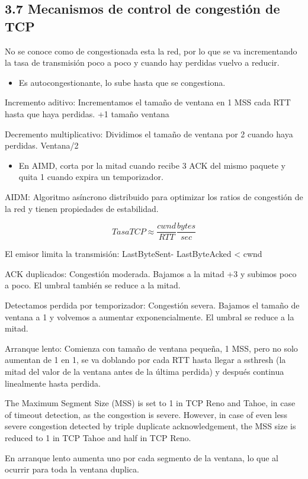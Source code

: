 \documentclass[12pt, twoside, openright]{report} %
\begin{document}
\subsection{3.7 Mecanismos de control de congestión de TCP}


No se conoce como de congestionada esta la red, por lo que se va
incrementando la tasa de transmisión poco a poco y cuando hay
perdidas vuelvo a reducir.

\begin{itemize}
	\item Es autocongestionante, lo sube hasta que se congestiona.
\end{itemize}

Incremento aditivo: Incrementamos el tamaño de ventana en 1 MSS cada
RTT hasta que haya perdidas. +1 tamaño ventana

Decremento multiplicativo: Dividimos el tamaño de ventana por 2
cuando haya perdidas. Ventana/2

\begin{itemize}
	\item En AIMD, corta por la mitad cuando recibe 3 ACK del mismo paquete
	      y quita 1 cuando expira un temporizador.
\end{itemize}

AIDM: Algoritmo asíncrono distribuido para optimizar los ratios de
congestión de la red y tienen propiedades de estabilidad.

$$Tasa TCP \approx \frac {cwnd} {RTT} \frac {bytes}{sec}$$

El emisor limita la transmisión: LastByteSent- LastByteAcked
\textless{} cwnd

ACK duplicados: Congestión moderada. Bajamos a la mitad +3 y
subimos poco a poco. El umbral también se reduce a la mitad.

Detectamos perdida por temporizador: Congestión severa. Bajamos el
tamaño de ventana a 1 y volvemos a aumentar exponencialmente. El
umbral se reduce a la mitad.

Arranque lento: Comienza con tamaño de ventana pequeña, 1 MSS, pero
no solo aumentan de 1 en 1, se va doblando por cada RTT hasta llegar
a ssthresh (la mitad del valor de la ventana antes de la última
perdida) y después continua linealmente hasta perdida.

The Maximum Segment Size (MSS) is set to 1 in TCP Reno and Tahoe, in
case of timeout detection, as the congestion is severe. However, in
case of even less severe congestion detected by triple duplicate
acknowledgement, the MSS size is reduced to 1 in TCP Tahoe and half
in TCP Reno.
\begin{figure}[H]
	{\def\svgwidth{.9\textwidth}
		}
\end{figure}
En arranque lento aumenta uno por cada segmento de la ventana, lo
que al ocurrir para toda la ventana duplica.
\end{document}
